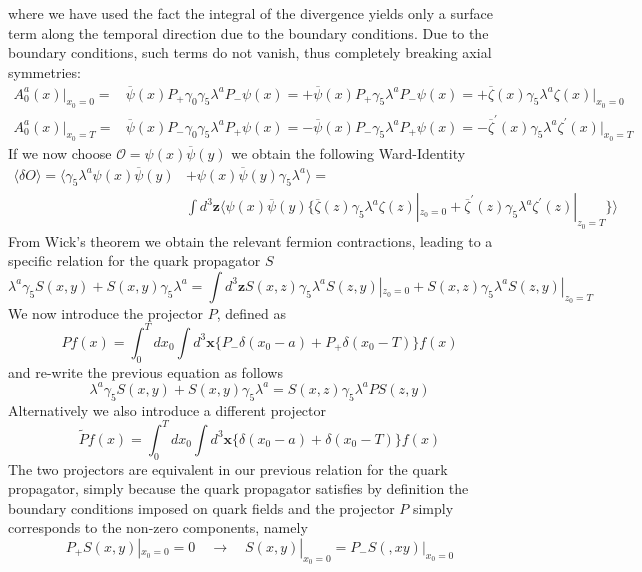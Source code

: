 \documentclass[a4paper]{scrartcl}
\def\psibar{\overline{\psi}}
\def\zetabar{\overline{\zeta}}
\def\mib{\pmb}
\begin{document}
where we have used the fact the integral of the divergence yields only 
a surface term along the temporal direction due to the boundary conditions.
Due to the boundary conditions, such terms do not vanish, thus
completely breaking axial symmetries:
\begin{equation}
\begin{split}
A^a_0(x) \big|_{x_0=0} = & \psibar(x) P_+ \gamma_0 \gamma_5 \lambda^a P_- \psi(x) = 
+ \psibar(x) P_+ \gamma_5 \lambda^a P_- \psi(x) = 
+ \zetabar(x) \gamma_5 \lambda^a \zeta(x) |_{x_0=0} \\
A^a_0(x) \big|_{x_0=T} = &\psibar(x) P_- \gamma_0 \gamma_5 \lambda^a P_+ \psi(x) = 
- \psibar(x) P_- \gamma_5 \lambda^a P_+ \psi(x) = 
- \zetabar^\prime(x) \gamma_5 \lambda^a \zeta^\prime(x) |_{x_0=T}
\end{split}
\end{equation}
If we now choose $\mathcal O = \psi(x) \psibar(y)$ we obtain the following 
Ward-Identity
\begin{equation}
\begin{split}
\langle \delta O \rangle = \langle \gamma_5 \lambda^a \psi(x) \psibar(y) 
& + \psi(x) \psibar(y) \gamma_5 \lambda^a \rangle = \\ &  
\int d^3 {\mib z} \langle \psi(x) \psibar(y) \big\{
\zetabar(z) \gamma_5 \lambda^a \zeta(z) |_{z_0=0} + 
\zetabar^\prime(z) \gamma_5 \lambda^a \zeta^\prime(z) |_{z_0=T}
\big\} \rangle 
\end{split}
\end{equation}
From Wick's theorem we obtain the relevant fermion contractions, 
leading to a specific relation for the quark propagator $S$
\begin{equation}
\lambda^a \gamma_5 S(x,y) + S(x,y) \gamma_5 \lambda^a = 
\int d^3 {\mib z} S(x,z) \gamma_5 \lambda^a S(z,y) |_{z_0=0} + 
S(x,z) \gamma_5 \lambda^a S(z,y) |_{z_0=T}
\end{equation}
We now introduce the projector $P$, defined as
\begin{equation}
P f(x) = \int_0^T dx_0 \int d^3 {\mib x} 
\big\{P_- \delta(x_0-a) + P_+ \delta(x_0-T) \big\} f(x)
\end{equation}
and re-write the previous equation as follows
\begin{equation}
\lambda^a \gamma_5 S(x,y) + S(x,y) \gamma_5 \lambda^a = 
S(x,z) \gamma_5 \lambda^a P S(z,y) 
\end{equation}
Alternatively we also introduce a different projector 
\begin{equation}
\tilde P f(x) = \int_0^T dx_0 \int d^3 {\mib x}
\big\{\delta(x_0-a) + \delta(x_0-T) \big\} f(x)
\end{equation}
The two projectors are equivalent in our previous 
relation for the quark propagator, simply because
the quark propagator satisfies by definition the 
boundary conditions imposed on quark fields and the
projector $P$ simply corresponds to the non-zero 
components, namely
\begin{equation}
P_+ S(x,y) |_{x_0=0} = 0 \quad \to \quad 
S(x,y) |_{x_0=0} = P_- S(,xy) |_{x_0=0}
\end{equation}
\end{document}
